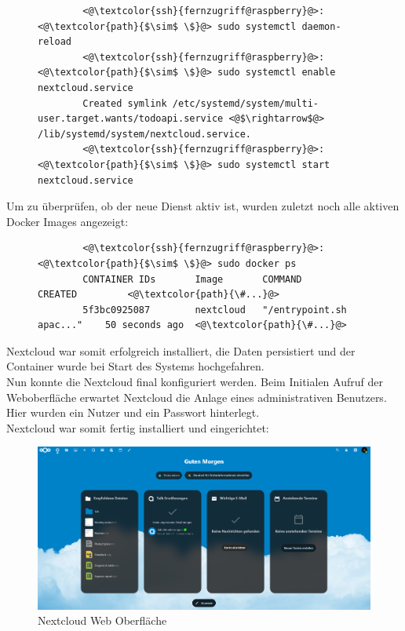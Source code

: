 \documentclass[a4paper, 12pt]{scrartcl}
\begin{document}
\begin{figure}[H]
    \begin{mdframed}[backgroundcolor=bbg]
        \begin{lstlisting}
        <@\textcolor{ssh}{fernzugriff@raspberry}@>:<@\textcolor{path}{$\sim$ \$}@> sudo systemctl daemon-reload
        <@\textcolor{ssh}{fernzugriff@raspberry}@>:<@\textcolor{path}{$\sim$ \$}@> sudo systemctl enable nextcloud.service
        Created symlink /etc/systemd/system/multi-user.target.wants/todoapi.service <@$\rightarrow$@> /lib/systemd/system/nextcloud.service.
        <@\textcolor{ssh}{fernzugriff@raspberry}@>:<@\textcolor{path}{$\sim$ \$}@> sudo systemctl start nextcloud.service
        \end{lstlisting}
    \end{mdframed}
    \label{lst:enable_service}
\end{figure}
Um zu überprüfen, ob der neue Dienst aktiv ist, wurden zuletzt noch alle aktiven Docker Images angezeigt:
\begin{figure}[H]
    \begin{mdframed}[backgroundcolor=bbg]
        \begin{lstlisting}
        <@\textcolor{ssh}{fernzugriff@raspberry}@>:<@\textcolor{path}{$\sim$ \$}@> sudo docker ps
        CONTAINER IDs       Image       COMMAND                     CREATED         <@\textcolor{path}{\#...}@>
        5f3bc0925087        nextcloud   "/entrypoint.sh apac..."    50 seconds ago  <@\textcolor{path}{\#...}@>
        \end{lstlisting}
    \end{mdframed}
    \label{lst:enable_service}
\end{figure}
Nextcloud war somit erfolgreich installiert, die Daten persistiert und der Container wurde bei Start des Systems hochgefahren.
\\
Nun konnte die Nextcloud final konfiguriert werden. Beim Initialen Aufruf der Weboberfläche erwartet Nextcloud die Anlage eines administrativen Benutzers. Hier wurden
ein Nutzer und ein Passwort hinterlegt.
\\
Nextcloud war somit fertig installiert und eingerichtet:
\begin{figure}[H]
    \begin{center}
        \includegraphics[scale=0.2]{Bilder/nextcloud_web_app.png}
        \caption{Nextcloud Web Oberfläche}
    \end{center}
\end{figure}
\end{document}
